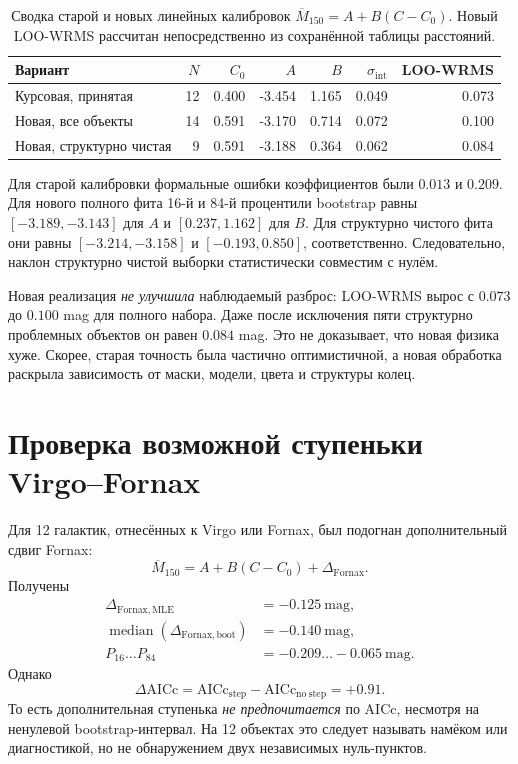 \documentclass[12pt,a4paper]{article}
\begin{document}
\begin{table}[htbp]
\centering
\small
\caption{Сводка старой и новых линейных калибровок
\(\overline M_{150}=A+B(C-C_0)\). Новый LOO-WRMS рассчитан
непосредственно из сохранённой таблицы расстояний.}
\label{tab:fit_comparison}
\begin{tabular}{lrrrrrr}
\toprule
Вариант & \(N\) & \(C_0\) & \(A\) & \(B\) &
\(\sigma_{\mathrm{int}}\) & LOO-WRMS \\
\midrule
Курсовая, принятая & 12 & 0.400 & -3.454 & 1.165 & 0.049 & 0.073 \\
Новая, все объекты & 14 & 0.591 & -3.170 & 0.714 & 0.072 & 0.100 \\
Новая, структурно чистая & 9 & 0.591 & -3.188 & 0.364 & 0.062 & 0.084 \\
\bottomrule
\end{tabular}
\end{table}

Для старой калибровки формальные ошибки коэффициентов были
\(0.013\) и \(0.209\). Для нового полного фита 16-й и 84-й
процентили bootstrap равны
\([-3.189,-3.143]\) для \(A\) и
\([0.237,1.162]\) для \(B\). Для структурно чистого фита они
равны \([-3.214,-3.158]\) и
\([-0.193,0.850]\), соответственно. Следовательно, наклон
структурно чистой выборки статистически совместим с нулём.

Новая реализация \emph{не улучшила} наблюдаемый разброс:
LOO-WRMS вырос с \(0.073\) до \(0.100\) mag для полного
набора. Даже после исключения пяти структурно проблемных
объектов он равен \(0.084\) mag. Это не доказывает, что новая
физика хуже. Скорее, старая точность была частично
оптимистичной, а новая обработка раскрыла зависимость от
маски, модели, цвета и структуры колец.

\section{Проверка возможной ступеньки Virgo--Fornax}

Для 12 галактик, отнесённых к Virgo или Fornax, был
подогнан дополнительный сдвиг Fornax:
\begin{equation}
    \overline M_{150}
    = A+B(C-C_0)+\Delta_{\mathrm{Fornax}}.
\end{equation}
Получены
\begin{align}
    \Delta_{\mathrm{Fornax,MLE}} &= -0.125~\mathrm{mag},\\
    \operatorname{median}
    \left(\Delta_{\mathrm{Fornax,boot}}\right)
    &= -0.140~\mathrm{mag},\\
    P_{16}\ldots P_{84}
    &= -0.209\ldots-0.065~\mathrm{mag}.
\end{align}
Однако
\begin{equation}
    \Delta\mathrm{AICc}
    = \mathrm{AICc}_{\mathrm{step}}
    -\mathrm{AICc}_{\mathrm{no\ step}}
    = +0.91.
\end{equation}
То есть дополнительная ступенька \emph{не предпочитается}
по AICc, несмотря на ненулевой bootstrap-интервал. На 12
объектах это следует называть намёком или диагностикой, но
не обнаружением двух независимых нуль-пунктов.
\end{document}
